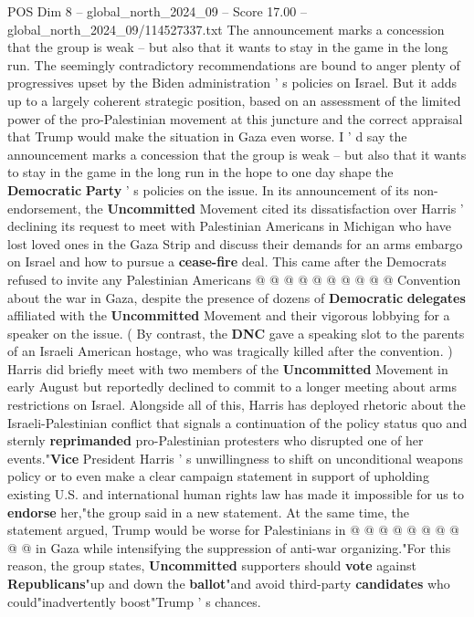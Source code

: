 \begin{textsample}{POS Dim 8 – global\_north\_2024\_09 – Score 17.00 – global\_north\_2024\_09/114527337.txt}  \label{ex:f8_pos_081}
The announcement marks a concession that the group is weak -- but also that it wants to stay in the game in the long run.
The seemingly contradictory recommendations are bound to anger plenty of progressives upset by the Biden administration ' s policies on Israel.
But it adds up to a largely coherent strategic position, based on an assessment of the limited power of the pro-Palestinian movement at this juncture and the correct appraisal that Trump would make the situation in Gaza even worse.
I ' d say the announcement marks a concession that the group is weak -- but also that it wants to stay in the game in the long run in the hope to one day shape the \textbf{Democratic} \textbf{Party} ' s policies on the issue.
In its announcement of its non-endorsement, the \textbf{Uncommitted} Movement cited its dissatisfaction over Harris ' declining its request to meet with Palestinian Americans in Michigan who have lost loved ones in the Gaza Strip and discuss their demands for an arms embargo on Israel and how to pursue a \textbf{cease-fire} deal.
This came after the Democrats refused to invite any Palestinian Americans @ @ @ @ @ @ @ @ @ @ Convention about the war in Gaza, despite the presence of dozens of \textbf{Democratic} \textbf{delegates} affiliated with the \textbf{Uncommitted} Movement and their vigorous lobbying for a speaker on the issue. ( By contrast, the \textbf{DNC} gave a speaking slot to the parents of an Israeli American hostage, who was tragically killed after the convention. ) Harris did briefly meet with two members of the \textbf{Uncommitted} Movement in early August but reportedly declined to commit to a longer meeting about arms restrictions on Israel.
Alongside all of this, Harris has deployed rhetoric about the Israeli-Palestinian conflict that signals a continuation of the policy status quo and sternly \textbf{reprimanded} pro-Palestinian protesters who disrupted one of her events."\textbf{Vice} President Harris ' s unwillingness to shift on unconditional weapons policy or to even make a clear campaign statement in support of upholding existing U.S. and international human rights law has made it impossible for us to \textbf{endorse} her,"the group said in a new statement.
At the same time, the statement argued, Trump would be worse for Palestinians in @ @ @ @ @ @ @ @ @ @ in Gaza while intensifying the suppression of anti-war organizing."For this reason, the group states, \textbf{Uncommitted} supporters should \textbf{vote} against \textbf{Republicans}"up and down the \textbf{ballot}"and avoid third-party \textbf{candidates} who could"inadvertently boost"Trump ' s chances.

\end{textsample}
